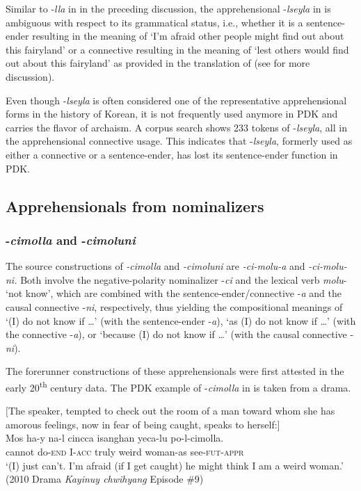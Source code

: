 \documentclass[output=paper,colorlinks,citecolor=brown]{langscibook}
\begin{document}
 Similar to \nobreakdash-\textit{lla} in  in the preceding discussion, the apprehensional \nobreakdash-\textit{lseyla} in  is ambiguous with respect to its grammatical status, i.e., whether it is a sentence-ender resulting in the meaning of `I'm afraid other people might find out about this fairyland' or a connective resulting in the meaning of `lest others would find out about this fairyland' as provided in the translation of  (see  for more discussion).

Even though \nobreakdash-\textit{lseyla} is often considered one of the representative apprehensional forms in the history of Korean, it is not frequently used anymore in PDK and carries the flavor of archaism. A corpus search shows 233 tokens of \nobreakdash-\textit{lseyla}, all in the apprehensional connective usage. This indicates that \nobreakdash-\textit{lseyla}, formerly used as either a connective or a sentence-ender, has lost its sentence-ender function in PDK.


\subsection{Apprehensionals from nominalizers}
\label{subsec:nominalizers}

\subsubsection{-\textit{cimolla} and -\textit{cimoluni}}

The source constructions of \textit{-cimolla} and \textit{-cimoluni} are \textit{-ci-molu-a} and \textit{-ci-molu-ni.} Both involve the negative-polarity nominalizer \nobreakdash-\textit{ci} and the lexical verb \textit{molu}- `not know', which are combined with the sentence-ender/connective \nobreakdash-\textit{a} and the causal connective \nobreakdash-\textit{ni}, respectively, thus yielding the compositional meanings of `(I) do not know if …' (with the sentence-ender \nobreakdash-\textit{a}), `as (I) do not know if …' (with the connective \nobreakdash-\textit{a}), or `because (I) do not know if …' (with the causal connective \nobreakdash-\textit{ni}).

The forerunner constructions of these apprehensionals were first attested in the early 20\textsuperscript{th} century data. The PDK example of \nobreakdash-\textit{cimolla} in  is taken from a drama.

\ea \label{ex:RK12} \textnormal{$[$The speaker, tempted to check out the room of a man toward whom she has amorous feelings, now in fear of being caught, speaks to herself:$]$} \\
\gll Mos ha-y na-l cincca isanghan yeca-lu po-l-cimolla. \\
cannot do-\textsc{end} I-\textsc{acc} truly weird woman-as see-\textsc{fut-appr} \\
\glt `(I) just can't. I'm afraid (if I get caught) he might think I am a weird woman.' (2010 Drama \textit{Kayinuy chwihyang} Episode \#9)
\z
\end{document}
